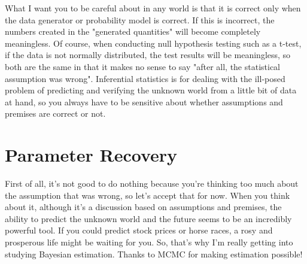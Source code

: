 \documentclass{ltjsbook}
\begin{document}
What I want you to be careful about in any world is that it is correct only when the data generator or probability model is correct. If this is incorrect, the numbers created in the "generated quantities" will become completely meaningless. Of course, when conducting null hypothesis testing such as a t-test, if the data is not normally distributed, the test results will be meaningless, so both are the same in that it makes no sense to say "after all, the statistical assumption was wrong". Inferential statistics is for dealing with the ill-posed problem of predicting and verifying the unknown world from a little bit of data at hand, so you always have to be sensitive about whether assumptions and premises are correct or not.


\section{Parameter Recovery}
First of all, it's not good to do nothing because you're thinking too much about the assumption that was wrong, so let's accept that for now.
When you think about it, although it's a discussion based on assumptions and premises, the ability to predict the unknown world and the future seems to be an incredibly powerful tool. If you could predict stock prices or horse races, a rosy and prosperous life might be waiting for you.
So, that's why I'm really getting into studying Bayesian estimation. Thanks to MCMC for making estimation possible!
\end{document}
